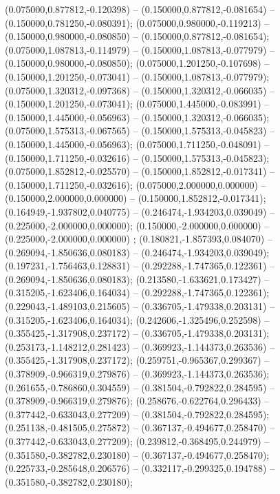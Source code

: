  (0.075000,0.877812,-0.120398) -- (0.150000,0.877812,-0.081654) -- (0.150000,0.781250,-0.080391);
 (0.075000,0.980000,-0.119213) -- (0.150000,0.980000,-0.080850) -- (0.150000,0.877812,-0.081654);
 (0.075000,1.087813,-0.114979) -- (0.150000,1.087813,-0.077979) -- (0.150000,0.980000,-0.080850);
 (0.075000,1.201250,-0.107698) -- (0.150000,1.201250,-0.073041) -- (0.150000,1.087813,-0.077979);
 (0.075000,1.320312,-0.097368) -- (0.150000,1.320312,-0.066035) -- (0.150000,1.201250,-0.073041);
 (0.075000,1.445000,-0.083991) -- (0.150000,1.445000,-0.056963) -- (0.150000,1.320312,-0.066035);
 (0.075000,1.575313,-0.067565) -- (0.150000,1.575313,-0.045823) -- (0.150000,1.445000,-0.056963);
 (0.075000,1.711250,-0.048091) -- (0.150000,1.711250,-0.032616) -- (0.150000,1.575313,-0.045823);
 (0.075000,1.852812,-0.025570) -- (0.150000,1.852812,-0.017341) -- (0.150000,1.711250,-0.032616);
 (0.075000,2.000000,0.000000) -- (0.150000,2.000000,0.000000) -- (0.150000,1.852812,-0.017341);
 (0.164949,-1.937802,0.040775) -- (0.246474,-1.934203,0.039049) -- (0.225000,-2.000000,0.000000);
 (0.150000,-2.000000,0.000000) -- (0.225000,-2.000000,0.000000) ;
 (0.180821,-1.857393,0.084070) -- (0.269094,-1.850636,0.080183) -- (0.246474,-1.934203,0.039049);
 (0.197231,-1.756463,0.128831) -- (0.292288,-1.747365,0.122361) -- (0.269094,-1.850636,0.080183);
 (0.213580,-1.633621,0.173427) -- (0.315205,-1.623406,0.164034) -- (0.292288,-1.747365,0.122361);
 (0.229043,-1.489103,0.215605) -- (0.336705,-1.479338,0.203131) -- (0.315205,-1.623406,0.164034);
 (0.242606,-1.325496,0.252598) -- (0.355425,-1.317908,0.237172) -- (0.336705,-1.479338,0.203131);
 (0.253173,-1.148212,0.281423) -- (0.369923,-1.144373,0.263536) -- (0.355425,-1.317908,0.237172);
 (0.259751,-0.965367,0.299367) -- (0.378909,-0.966319,0.279876) -- (0.369923,-1.144373,0.263536);
 (0.261655,-0.786860,0.304559) -- (0.381504,-0.792822,0.284595) -- (0.378909,-0.966319,0.279876);
 (0.258676,-0.622764,0.296433) -- (0.377442,-0.633043,0.277209) -- (0.381504,-0.792822,0.284595);
 (0.251138,-0.481505,0.275872) -- (0.367137,-0.494677,0.258470) -- (0.377442,-0.633043,0.277209);
 (0.239812,-0.368495,0.244979) -- (0.351580,-0.382782,0.230180) -- (0.367137,-0.494677,0.258470);
 (0.225733,-0.285648,0.206576) -- (0.332117,-0.299325,0.194788) -- (0.351580,-0.382782,0.230180);
